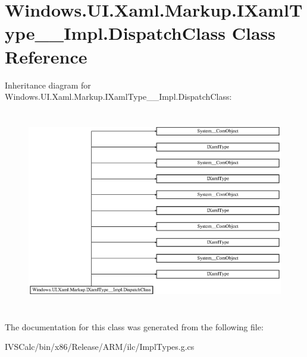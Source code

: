 \hypertarget{class_windows_1_1_u_i_1_1_xaml_1_1_markup_1_1_i_xaml_type_____impl_1_1_dispatch_class}{}\section{Windows.\+U\+I.\+Xaml.\+Markup.\+I\+Xaml\+Type\+\_\+\+\_\+\+Impl.\+Dispatch\+Class Class Reference}
\label{class_windows_1_1_u_i_1_1_xaml_1_1_markup_1_1_i_xaml_type_____impl_1_1_dispatch_class}
Inheritance diagram for Windows.\+U\+I.\+Xaml.\+Markup.\+I\+Xaml\+Type\+\_\+\+\_\+\+Impl.\+Dispatch\+Class\+:\begin{figure}[H]
\begin{center}
\leavevmode
\includegraphics[height=8.876081cm]{class_windows_1_1_u_i_1_1_xaml_1_1_markup_1_1_i_xaml_type_____impl_1_1_dispatch_class}
\end{center}
\end{figure}


The documentation for this class was generated from the following file\+:\begin{DoxyCompactItemize}
\item 
I\+V\+S\+Calc/bin/x86/\+Release/\+A\+R\+M/ilc/Impl\+Types.\+g.\+cs\end{DoxyCompactItemize}
